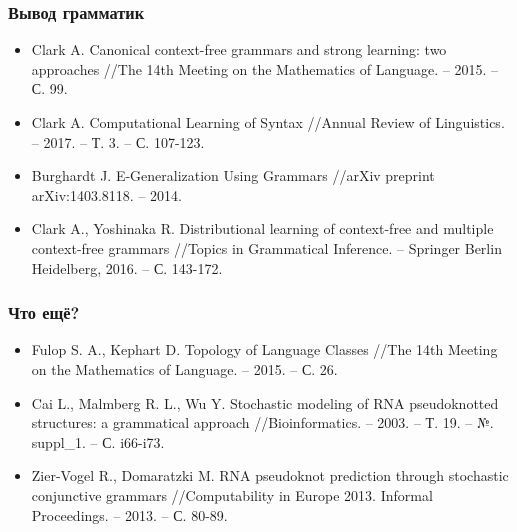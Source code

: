 \documentclass{beamer}
\begin{document}
\begin{frame}[fragile]
\transwipe[direction=90]
\frametitle{Вывод грамматик}
  \begin{itemize}
    \item Clark A. Canonical context-free grammars and strong learning: two approaches //The 14th Meeting on the Mathematics of Language. – 2015. – С. 99.
    \item Clark A. Computational Learning of Syntax //Annual Review of Linguistics. – 2017. – Т. 3. – С. 107-123.
    \item Burghardt J. E-Generalization Using Grammars //arXiv preprint arXiv:1403.8118. – 2014.
    \item Clark A., Yoshinaka R. Distributional learning of context-free and multiple context-free grammars //Topics in Grammatical Inference. – Springer Berlin Heidelberg, 2016. – С. 143-172.
  \end{itemize}
\end{frame}
      
\begin{frame}[fragile]
\transwipe[direction=90]
\frametitle{Что ещё?}
\begin{itemize}
\item Fulop S. A., Kephart D. Topology of Language Classes //The 14th Meeting on the Mathematics of Language. – 2015. – С. 26.
\item Cai L., Malmberg R. L., Wu Y. Stochastic modeling of RNA pseudoknotted structures: a grammatical approach //Bioinformatics. – 2003. – Т. 19. – №. suppl\_1. – С. i66-i73.
\item Zier-Vogel R., Domaratzki M. RNA pseudoknot prediction through stochastic conjunctive grammars //Computability in Europe 2013. Informal Proceedings. – 2013. – С. 80-89.
\end{itemize}
\end{frame}
\end{document}
